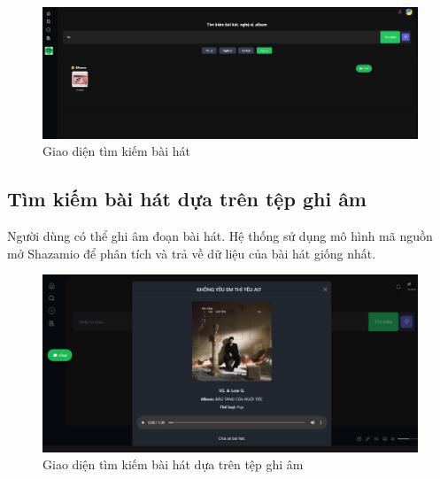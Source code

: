 \begin{figure}[H]
    \centering
    \includegraphics[width=1\textwidth]{imgs/chap5/tim_kiem_4.png}
    \caption{Giao diện tìm kiếm bài hát}
\end{figure}

\subsection{Tìm kiếm bài hát dựa trên tệp ghi âm}
Người dùng có thể ghi âm đoạn bài hát. Hệ thống sử dụng mô hình mã nguồn mở Shazamio để phân tích và trả về dữ liệu của bài hát giống nhất.

\begin{figure}[H]
    \centering
    \includegraphics[width=1\textwidth]{imgs/chap5/tim_kiem_5.png}
    \caption{Giao diện tìm kiếm bài hát dựa trên tệp ghi âm}
\end{figure}